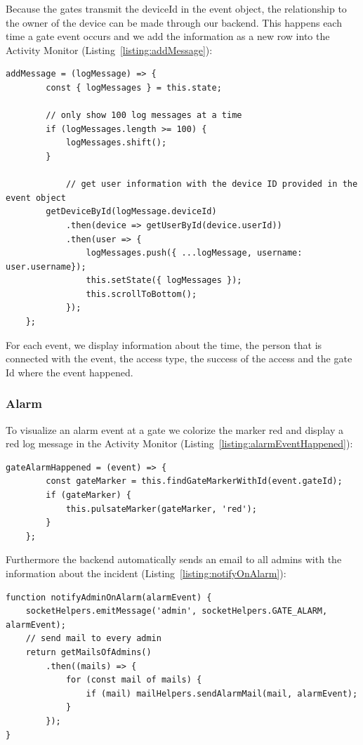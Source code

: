 Because the gates transmit the deviceId in the event object, the relationship to the owner of the device can be made through our backend. This happens each time a gate event occurs and we add the information as a new row into the Activity Monitor (Listing~\ref{listing:addMessage}):

\begin{lstlisting}[label={listing:addMessage},caption={Function for adding message to Activity Monitor}]
addMessage = (logMessage) => {
        const { logMessages } = this.state;
        
        // only show 100 log messages at a time
        if (logMessages.length >= 100) {
            logMessages.shift();
        }

            // get user information with the device ID provided in the event object
        getDeviceById(logMessage.deviceId)
            .then(device => getUserById(device.userId))
            .then(user => {
                logMessages.push({ ...logMessage, username: user.username});
                this.setState({ logMessages });
                this.scrollToBottom();
            });
    };
\end{lstlisting}

For each event, we display information about the time, the person that is connected with the event, the access type, the success of the access and the gate Id where the event happened.

\subsubsection{Alarm}

To visualize an alarm event at a gate we colorize the marker red and display a red log message in the Activity Monitor (Listing~\ref{listing:alarmEventHappened}):

\begin{lstlisting}[label={listing:alarmEventHappened},caption={Handling gate alarm events in frontend}]
gateAlarmHappened = (event) => {
        const gateMarker = this.findGateMarkerWithId(event.gateId);
        if (gateMarker) {
            this.pulsateMarker(gateMarker, 'red');
        }
    };
\end{lstlisting}

Furthermore the backend automatically sends an email to all admins with the information about the incident (Listing~\ref{listing:notifyOnAlarm}):

\begin{lstlisting}[label={listing:notifyOnAlarm},caption={Notifying admins on alarm event}]
function notifyAdminOnAlarm(alarmEvent) {
    socketHelpers.emitMessage('admin', socketHelpers.GATE_ALARM, alarmEvent);
    // send mail to every admin
    return getMailsOfAdmins()
        .then((mails) => {
            for (const mail of mails) {
                if (mail) mailHelpers.sendAlarmMail(mail, alarmEvent);
            }
        });
}
\end{lstlisting}

\clearpage
